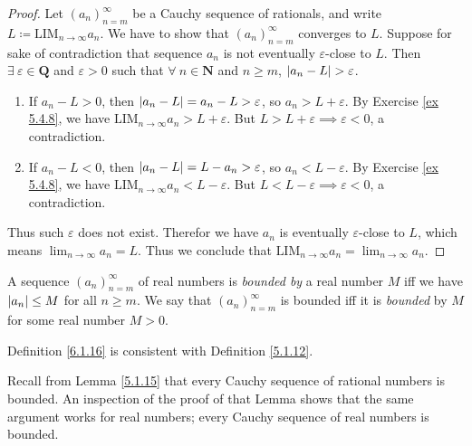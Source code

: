 \begin{proof}
Let \((a_n)_{n = m}^\infty\) be a Cauchy sequence of rationals, and write \(L \coloneqq \text{LIM}_{n \to \infty} a_n\).
We have to show that \((a_n)_{n = m}^\infty\) converges to \(L\).
Suppose for sake of contradiction that sequence \(a_n\) is not eventually \(\varepsilon\)-close to \(L\).
Then \(\exists\ \varepsilon \in \mathbf{Q}\) and \(\varepsilon > 0\) such that \(\forall\ n \in \mathbf{N}\) and \(n \geq m\), \(\abs*{a_n - L} > \varepsilon\).
\begin{enumerate}
    \item If \(a_n - L > 0\), then \(\abs*{a_n - L} = a_n - L > \varepsilon\), so \(a_n > L + \varepsilon\).
    By Exercise \ref{ex 5.4.8}, we have \(\text{LIM}_{n \to \infty} a_n > L + \varepsilon\).
    But \(L > L + \varepsilon \implies \varepsilon < 0\), a contradiction.
    \item If \(a_n - L < 0\), then \(\abs*{a_n - L} = L - a_n > \varepsilon\), so \(a_n < L - \varepsilon\).
    By Exercise \ref{ex 5.4.8}, we have \(\text{LIM}_{n \to \infty} a_n < L - \varepsilon\).
    But \(L < L - \varepsilon \implies \varepsilon < 0\), a contradiction.
\end{enumerate}
Thus such \(\varepsilon\) does not exist.
Therefor we have \(a_n\) is eventually \(\varepsilon\)-close to \(L\), which means \(\lim_{n \to \infty} a_n = L\).
Thus we conclude that \(\text{LIM}_{n \to \infty} a_n = \lim_{n \to \infty} a_n\).
\end{proof}

\begin{definition}\label{6.1.16}
A sequence \((a_n)_{n = m}^\infty\) of real numbers is \emph{bounded by} a real number \(M\) iff we have \(\abs*{a_n} \leq M\) for all \(n \geq m\).
We say that \((a_n)_{n = m}^\infty\) is bounded iff it is \emph{bounded} by \(M\) for some real number \(M > 0\).
\end{definition}

\begin{note}
Definition \ref{6.1.16} is consistent with Definition \ref{5.1.12}.
\end{note}

\begin{note}
Recall from Lemma \ref{5.1.15} that every Cauchy sequence of rational numbers is bounded.
An inspection of the proof of that Lemma shows that the same argument works for real numbers;
every Cauchy sequence of real numbers is bounded.
\end{note}


